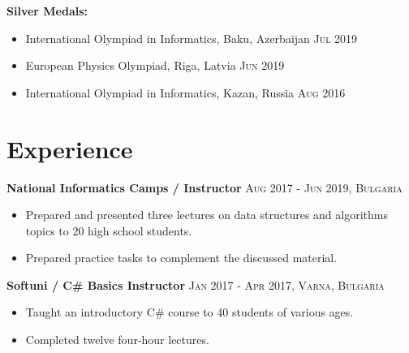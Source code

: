 \documentclass[letterpaper,11pt]{article}
\newcommand{\noskip}{\vspace{-\parskip}}
\newcommand{\doskip}{\vspace{\parskip}}
\begin{document}
\doskip
\textbf{Silver Medals:}
\noskip
\begin{itemize}
    \item International Olympiad in Informatics, Baku, Azerbaijan
        \hfill \textsc{Jul 2019}
    \item European Physics Olympiad, Riga, Latvia
        \hfill \textsc{Jun 2019}
    \item International Olympiad in Informatics, Kazan, Russia
        \hfill \textsc{Aug 2016}
\end{itemize}

\section*{Experience}
\textbf{National Informatics Camps / Instructor}
\hfill
\textsc{Aug 2017 - Jun 2019, Bulgaria}
\noskip
\begin{itemize}
    \item Prepared and presented three lectures on data structures and algorithms topics to 20 high school students.
    \item Prepared practice tasks to complement the discussed material.
\end{itemize}

\doskip
\textbf{Softuni / C\# Basics Instructor}
\hfill
\textsc{Jan 2017 - Apr 2017, Varna, Bulgaria}
\noskip
\begin{itemize}
    \item Taught an introductory C\# course to 40  students of various ages.
    \item Completed twelve four-hour lectures.
\end{itemize}
\end{document}
